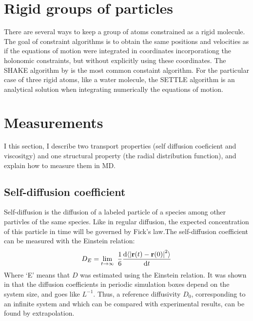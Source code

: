 \section{Rigid groups of particles}
There are several ways to keep a group of atoms constrained as a rigid molecule. The goal of constraint algorithms is to obtain the same positions and velocities as if the equations of motion were integrated in coordinates incorporationg the holonomic constraints, but without explicitly using these coordinates. The SHAKE algorithm by \citet{Ryckaert1977} is the most common constaint algorithm. For the particular case of three rigid atoms, like a water molecule, the SETTLE algorithm \cite{Miyamoto1992} is an analytical solution when integrating numerically the equations of motion.
\label{sec:shake}

\section{Measurements}
I this section, I describe two transport properties (self diffusion coeficient and viscositgy) and one structural property (the radial distribution function), and explain how to measure them in MD.

\subsection{Self-diffusion coefficient}
Self-diffusion is the diffusion of a labeled particle of a species among other partivles of the same species. Like in regular diffusion, the expected concentration of this particle in time will be governed by Fick's law.The self-diffusion coefficient can be measured with the Einstein relation:
\begin{equation}
	D_E = \lim_{t\to\infty} \frac{1}{6} \frac{\dd \langle \left|\rvec(t) - \rvec(0)\right|^2\rangle}{\dd t}
	\label{eq:Einstein_diffusivity}
\end{equation}
Where `E' means that $D$ was estimated using the Einstein relation. It was shown in \cite{Yeh2004} that the diffusion coefficients in periodic simulation boxes depend on the system size, and goes like $L^{-1}$. Thus, a reference diffusivity $D_0$, corresponding to an infinite system and which can be compared with experimental results, can be found by extrapolation.

